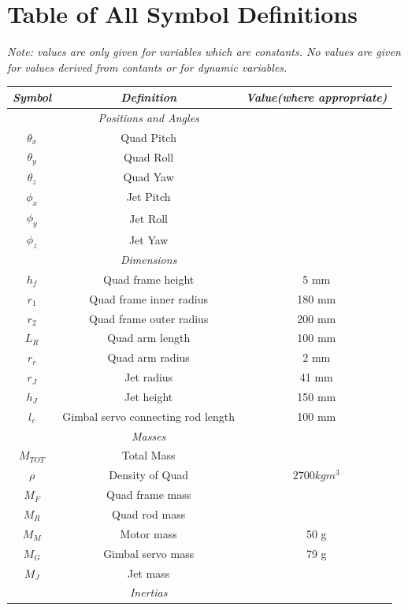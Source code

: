 \documentclass[11pt]{article}
\begin{document}
\section{Table of All Symbol Definitions}
\begin{center}
    \emph{Note: values are only given for variables which are constants. No values are given for values derived from contants or for dynamic variables.}
\begin{longtable}{|ccc|}
    \hline
    \emph{Symbol} & \emph{Definition} & \emph{Value(where appropriate)} \\
    \hline \endhead
    & \emph{Positions and Angles} & \\
    \hline
    $\theta_x$ & Quad Pitch & \\
    $\theta_y$ & Quad Roll & \\
    $\theta_z$ & Quad Yaw & \\
    $\phi_x$ & Jet Pitch & \\
    $\phi_y$ & Jet Roll & \\
    $\phi_z$ & Jet Yaw & \\
    \hline
    & \emph{Dimensions} & \\
    \hline
    $h_f$ & Quad frame height & 5 mm \\
    $r_1$ & Quad frame inner radius & 180 mm \\
    $r_2$ & Quad frame outer radius & 200 mm \\
    $L_R$ & Quad arm length & 100 mm \\
    $r_r$ & Quad arm radius & 2 mm \\
    $r_J$ & Jet radius & 41 mm \\
    $h_J$ & Jet height & 150 mm \\
    $l_c$ & Gimbal servo connecting rod length & 100 mm \\
    \hline
    & \emph{Masses} & \\
    \hline
    $M_{TOT}$ & Total Mass & \\
    $\rho$ & Density of Quad & $2700 kgm^3$ \\
    $M_F$ & Quad frame mass & \\
    $M_R$ & Quad rod mass & \\
    $M_M$ & Motor mass & 50 g \\
    $M_G$ & Gimbal servo mass & 79 g \\
    $M_J$ & Jet mass & \\
    \hline
    & \emph{Inertias} & \\

\end{longtable}
\end{center}
\end{document}
